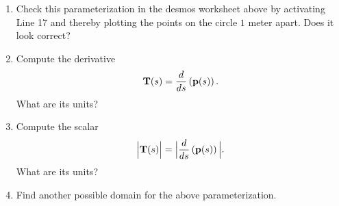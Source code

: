 \documentclass{ximera}
\begin{document}
\begin{question}
\begin{explanation}
\begin{enumerate}
\item Check this parameterization in the desmos worksheet above by activating Line 17 and thereby plotting the points on the circle $1$ meter apart. Does it look correct? %

\item Compute the derivative 
\[
     {\bf T}(s) = \frac{d}{ds}\left( {\bf p}(s) \right) . 
\]
What are its units?

\item Compute the scalar
\[
   \Big| {\bf T}(s) \Big|  = \Big|  \frac{d}{ds}\left( {\bf p}(s) \right) \Big| .
\]
What are its units? 

\item Find another possible domain for the above parameterization.

\begin{freeResponse}
\end{freeResponse}

\end{enumerate}


\end{explanation}
\end{question}
\end{document}
